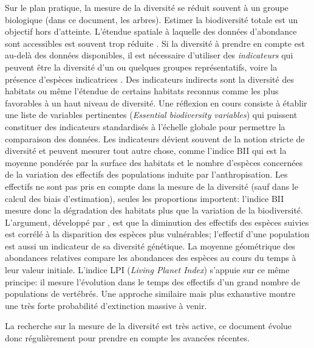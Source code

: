 \documentclass[
  11pt,
  french,
  a4paper,
  extrafontsizes,onecolumn,openright
  ]{memoir}
\newlength{\rf}
\begin{document}
Sur le plan pratique, la mesure de la diversité se réduit souvent à un groupe biologique (dans ce document, les arbres).
Estimer la biodiversité totale est un objectif hors d'atteinte.
L'étendue spatiale à laquelle des données d'abondance sont accessibles est souvent trop réduite \autocite{Chiarucci2011}.
Si la diversité à prendre en compte est au-delà des données disponibles, il est nécessaire d'utiliser des \emph{indicateurs} \autocite{Balmford2003} qui peuvent être la diversité d'un ou quelques groupes représentatifs, voire la présence d'espèces indicatrices \autocite{Clements1916}.
Des indicateurs indirects sont la diversité des habitats ou même l'étendue de certains habitats reconnus comme les plus favorables à un haut niveau de diversité.
Une réflexion en cours \autocite{Pereira2013} consiste à établir une liste de variables pertinentes (\emph{Essential biodiversity variables}) qui puissent constituer des indicateurs standardisés à l'échelle globale pour permettre la comparaison des données.
Les indicateurs dévient souvent de la notion stricte de diversité et peuvent mesurer tout autre chose, comme l'indice BII \autocite[\emph{Biodiversity Intactness Index},][]{Scholes2005} qui est la moyenne pondérée par la surface des habitats et le nombre d'espèces concernées de la variation des effectifs des populations induite par l'anthropisation.
Les effectifs ne sont pas pris en compte dans la mesure de la diversité (sauf dans le calcul des biais d'estimation), seules les proportions importent: l'indice BII mesure donc la dégradation des habitats plus que la variation de la biodiversité.
L'argument, développé par \textcite{Balmford2003}, est que la diminution des effectifs des espèces suivies est corrélé à la disparition des espèces plus vulnérables; l'effectif d'une population est aussi un indicateur de sa diversité génétique.
La moyenne géométrique des abondances relatives \autocite{Buckland2011} compare les abondances des espèces au cours du temps à leur valeur initiale.
L'indice LPI (\emph{Living Planet Index}) \autocite{Loh2005} s'appuie sur ce même principe: il mesure l'évolution dans le temps des effectifs d'un grand nombre de populations de vertébrés.
Une approche similaire mais plus exhaustive \autocite{Ceballos2017} montre une très forte probabilité d'extinction massive à venir.

La recherche sur la mesure de la diversité est très active, ce document évolue donc régulièrement pour prendre en compte les avancées récentes.


\end{document}

